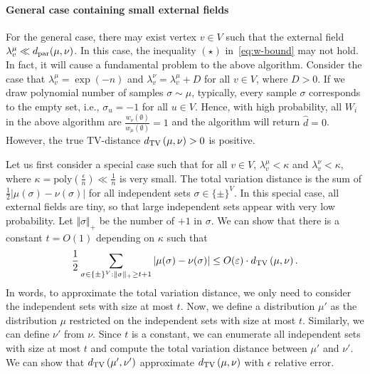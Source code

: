 \paragraph{General case containing small external fields} 
For the general case, there may exist vertex $v \in V$ such that the external field $\lambda^\mu_v \ll d_\mathrm{par}(\mu,\nu)$. In this case, the inequality $(\star)$ in~\eqref{eq:w-bound} may not hold. In fact, it will cause a fundamental problem to the above algorithm. Consider the case that $\lambda^\mu_v = \exp(-n)$ and $\lambda^\nu_v = \lambda^\mu_v + D$ for all $v \in V$, where $D > 0$. If we draw polynomial number of samples $\sigma \sim \mu$, typically, every sample $\sigma$ corresponds to the empty set, i.e., $\sigma_u = -1$ for all $ u \in V$. Hence, with high probability, all $W_i$ in the above algorithm are $\frac{w_\nu(\emptyset)}{w_\mu(\emptyset)} = 1$ and the algorithm will return $\hat{d} = 0$. However, the true TV-distance $d_{\mathrm{TV}}\left({\mu},{\nu}\right) > 0$ is positive. 

Let us first consider a special case such that for all $v \in V$, $\lambda^\mu_v < \kappa$ and $\lambda^\nu_v < \kappa$, where $\kappa =  \mathrm{poly}(\frac{\epsilon}{n}) \ll \frac{1}{n}$ is very small. 
%
The total variation distance is the sum of $\frac{1}{2}|\mu(\sigma)-\nu(\sigma)|$ for all independent sets $\sigma \in \{\pm\}^V$.  
In this special case, all external fields are tiny, so that large independent sets appear with very low probability.
Let $\Vert \sigma\Vert_+$ be the number of $+1$ in $\sigma$.
We can show that there is a constant $t = O(1)$ depending on $\kappa$ such that
\begin{align*}
    \frac{1}{2}\sum_{\sigma \in \{\pm\}^V: \Vert \sigma\Vert_+ \geq t+1} |\mu(\sigma)-\nu(\sigma)| \leq O(\varepsilon) \cdot d_{\mathrm{TV}}\left({\mu},{\nu}\right).
\end{align*} 
In words, to approximate the total variation distance, we only need to consider the independent sets with size at most $t$.
Now, we define a distribution $\mu'$ as the distribution $\mu$ restricted on the independent sets with size at most $t$.
Similarly, we can define $\nu'$ from $\nu$. 
Since $t$ is a constant, we can enumerate all independent sets with size at most $t$ and compute the total variation distance between $\mu'$ and $\nu'$.
We can show that $d_{\mathrm{TV}}\left({\mu'},{\nu'}\right)$ approximate $d_{\mathrm{TV}}\left({\mu},{\nu}\right)$ with $\epsilon$ relative error.

